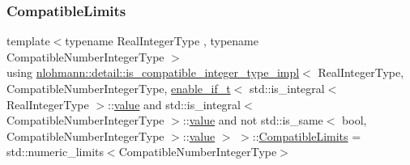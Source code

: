 \subsubsection{\texorpdfstring{Compatible\+Limits}{CompatibleLimits}}
{\footnotesize\ttfamily template$<$typename Real\+Integer\+Type , typename Compatible\+Number\+Integer\+Type $>$ \\
using \hyperlink{structnlohmann_1_1detail_1_1is__compatible__integer__type__impl}{nlohmann\+::detail\+::is\+\_\+compatible\+\_\+integer\+\_\+type\+\_\+impl}$<$ Real\+Integer\+Type, Compatible\+Number\+Integer\+Type, \hyperlink{namespacenlohmann_1_1detail_a02bcbc878bee413f25b985ada771aa9c}{enable\+\_\+if\+\_\+t}$<$ std\+::is\+\_\+integral$<$ Real\+Integer\+Type $>$\+::\hyperlink{structnlohmann_1_1detail_1_1is__compatible__integer__type__impl_3_01_real_integer_type_00_01_com5aa74bcf254245a639da00509f4d2655_a478242daac7a70e28c749bfec00d1c1b}{value} and std\+::is\+\_\+integral$<$ Compatible\+Number\+Integer\+Type $>$\+::\hyperlink{structnlohmann_1_1detail_1_1is__compatible__integer__type__impl_3_01_real_integer_type_00_01_com5aa74bcf254245a639da00509f4d2655_a478242daac7a70e28c749bfec00d1c1b}{value} and not std\+::is\+\_\+same$<$ bool, Compatible\+Number\+Integer\+Type $>$\+::\hyperlink{structnlohmann_1_1detail_1_1is__compatible__integer__type__impl_3_01_real_integer_type_00_01_com5aa74bcf254245a639da00509f4d2655_a478242daac7a70e28c749bfec00d1c1b}{value} $>$ $>$\+::\hyperlink{structnlohmann_1_1detail_1_1is__compatible__integer__type__impl_3_01_real_integer_type_00_01_com5aa74bcf254245a639da00509f4d2655_a002983b5c7c0f72b89d2151a6b39627d}{Compatible\+Limits} =  std\+::numeric\+\_\+limits$<$Compatible\+Number\+Integer\+Type$>$}

